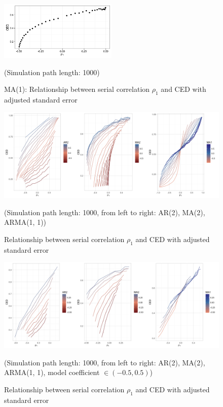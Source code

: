 \documentclass[11pt]{article}
\begin{document}
\begin{figure}[H]
\centering
\includegraphics[width = 0.5\textwidth]{../figures/simulation/MA1_adjsd}
\caption{MA(1): Relationship between serial correlation $\rho_1$ and CED with adjusted standard error}
(Simulation path length: 1000)
\label{fig:MA1_adjsd}
\end{figure}

\begin{figure}[H]
\centering
\includegraphics[width = 1\textwidth]{../figures/simulation/aggregated_adjsd}
\caption{Relationship between serial correlation $\rho_1$ and CED with adjusted standard error}
(Simulation path length: 1000, from left to right: AR(2), MA(2), ARMA(1, 1))
\label{fig:aggregated_adjsd}
\end{figure}

\begin{figure}[H]
\centering
\includegraphics[width = 1\textwidth]{../figures/simulation/aggregated_adjsd_subset}
\caption{Relationship between serial correlation $\rho_1$ and CED with adjusted standard error}
(Simulation path length: 1000, from left to right: AR(2), MA(2), ARMA(1, 1), model coefficient $\in(-0.5, 0.5)$)
\label{fig:aggregated_adjsd_subset}
\end{figure}
\end{document}
